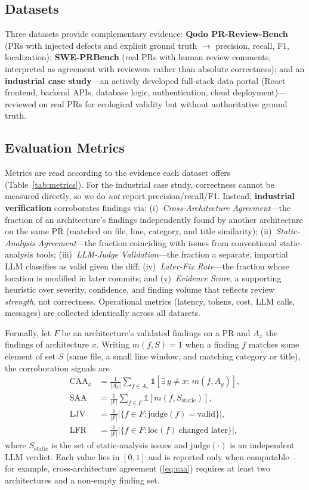 \documentclass[conference]{IEEEtran}
\begin{document}
\subsection{Datasets}
Three datasets provide complementary evidence: \textbf{Qodo PR-Review-Bench}
(PRs with injected defects and explicit ground truth $\rightarrow$ precision,
recall, F1, localization); \textbf{SWE-PRBench} (real PRs with human review
comments, interpreted as agreement with reviewers rather than absolute
correctness); and an \textbf{industrial case study}---an actively developed
full-stack data portal (React frontend, backend APIs, database logic,
authentication, cloud deployment)---reviewed on real PRs for ecological validity
but without authoritative ground truth.

\subsection{Evaluation Metrics}
Metrics are read according to the evidence each dataset offers
(Table~\ref{tab:metrics}). For the industrial case study, correctness cannot be
measured directly, so we do \emph{not} report precision/recall/F1. Instead,
\textbf{industrial verification} corroborates findings via:
(i)~\emph{Cross-Architecture Agreement}---the fraction of an architecture's
findings independently found by another architecture on the same PR (matched on
file, line, category, and title similarity);
(ii)~\emph{Static-Analysis Agreement}---the fraction coinciding with issues from
conventional static-analysis tools;
(iii)~\emph{LLM-Judge Validation}---the fraction a separate, impartial LLM
classifies as valid given the diff;
(iv)~\emph{Later-Fix Rate}---the fraction whose location is modified in later
commits; and
(v)~\emph{Evidence Score}, a supporting heuristic over severity, confidence, and
finding volume that reflects review \emph{strength}, not correctness. Operational
metrics (latency, tokens, cost, LLM calls, messages) are collected identically
across all datasets.

Formally, let $F$ be an architecture's validated findings on a PR and $A_x$ the
findings of architecture $x$. Writing $m(f,S)=1$ when a finding $f$ matches some
element of set $S$ (same file, a small line window, and matching category or
title), the corroboration signals are
\begin{align}
\mathrm{CAA}_x &= \tfrac{1}{|A_x|}\!\sum_{f\in A_x}\!
   \mathbb{1}\!\left[\exists\,y\neq x:\, m(f,A_y)\right], \label{eq:caa}\\
\mathrm{SAA}   &= \tfrac{1}{|F|}\!\sum_{f\in F}\!
   \mathbb{1}\!\left[m(f,S_{\mathrm{static}})\right], \\
\mathrm{LJV}   &= \tfrac{1}{|F|}\bigl|\{f\in F:\mathrm{judge}(f)=\text{valid}\}\bigr|, \\
\mathrm{LFR}   &= \tfrac{1}{|F|}\bigl|\{f\in F:\mathrm{loc}(f)\ \text{changed later}\}\bigr|,
\end{align}
where $S_{\mathrm{static}}$ is the set of static-analysis issues and
$\mathrm{judge}(\cdot)$ is an independent LLM verdict. Each value lies in $[0,1]$
and is reported only when computable---for example, cross-architecture agreement
(\ref{eq:caa}) requires at least two architectures and a non-empty finding set.
\end{document}
